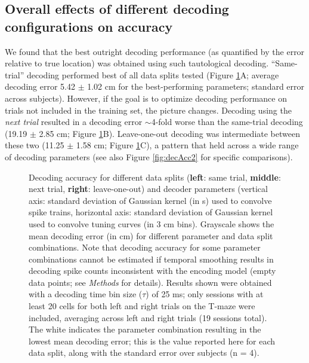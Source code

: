 \documentclass[11pt]{article}
\newcommand{\bsf}[1]{\textbf{#1}}
\begin{document}
\subsection*{Overall effects of different decoding configurations on accuracy}

We found that the best outright decoding performance (as quantified by
the error relative to true location) was obtained using such
tautological decoding. ``Same-trial'' decoding performed best of all
data splits tested (Figure \ref{fig:decAcc}A; average decoding error
5.42 $\pm$ 1.02 cm for the best-performing parameters; standard error
across subjects). However, if the goal is to optimize decoding
performance on trials not included in the training set, the picture
changes. Decoding using the {\it next trial} resulted in a decoding
error $\sim$4-fold worse than the same-trial decoding (19.19 $\pm$
2.85 cm; Figure \ref{fig:decAcc}B). Leave-one-out decoding was
intermediate between these two (11.25 $\pm$ 1.58 cm; Figure
\ref{fig:decAcc}C), a pattern that held across a wide range of
decoding parameters (see also Figure \ref{fig:decAcc2} for specific
comparisons).

\begin{figure}[h]
  \centering
    \caption{Decoding accuracy for different data splits (\bsf{left}:
      same trial, \bsf{middle}: next trial, \bsf{right}:
      leave-one-out) and decoder parameters (vertical axis: standard
      deviation of Gaussian kernel (in s) used to convolve spike
      trains, horizontal axis: standard deviation of Gaussian kernel
      used to convolve tuning curves (in 3 cm bins). Grayscale shows
      the mean decoding error (in cm) for different parameter and data
      split combinations. Note that decoding accuracy for some
      parameter combinations cannot be estimated if temporal smoothing
      results in decoding spike counts inconsistent with the encoding
      model (empty data points; see {\it Methods} for
      details). Results shown were obtained with a decoding time bin
      size ($\tau$) of 25 ms; only sessions with at least 20 cells for
      both left and right trials on the T-maze were included,
      averaging across left and right trials (19 sessions total). The
      white  indicates the parameter
      combination resulting in the lowest mean decoding error; this is
      the value reported here for each data split, along with the
      standard error over subjects (n = 4).}
  \label{fig:decAcc}
\end{figure}
\end{document}
